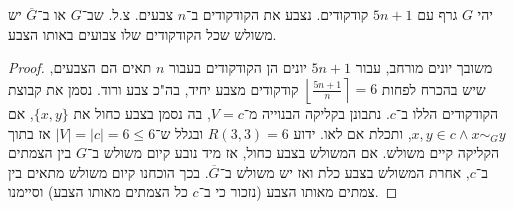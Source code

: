 \documentclass[]{article}
\newcommand\rc    {\right\rceil}
\newcommand\lf    {\left\lfloor}
\newcommand\ol    {\overline}
\begin{document}
	\section{}
	יהי $G$ גרף עם $5n + 1$ קודקודים. נצבע את הקודקודים ב־$n$ צבעים. צ.ל. שב־$G$ או ב־$\ol G$ יש משולש שכל הקודקודים שלו צבועים באותו הצבע. 
	
	\begin{proof}
		משובך יונים מורחב, עבור $5n  +1$ יונים הן הקודקודים בעבור $n$ תאים הם הצבעים, שיש בהכרח לפחות $\lf \frac{5n + 1}{n} \rc = 6$ קודקודים מצבע יחיד, בה"כ צבע ורוד. נסמן את קבוצת הקודקודים הללו ב־$c$. נתבונן בקליקה הבנוייה מ־$V = c$, בה נסמן בצבע כחול את $\{x, y\}$, אם $x, y \in c \land x \sim_G y$, ותכלת אם לאו. ידוע $R(3, 3) = 6$ ובגלל ש־$|V| = |c| = 6 \le 6$ אז בתוך הקליקה קיים משולש. אם המשולש בצבע כחול, אז מיד נובע קיום משולש ב־$G$ בין הצמתים ב־$c$, אחרת המשולש בצבע כלת ואז יש משולש ב־$\ol G$. בכך הוכחנו קיום משולש מתאים בין צמתים מאותו הצבע (נזכור כי ב־$c$ כל הצמתים מאותו הצבע) וסיימנו. 
	\end{proof}
	
\end{document}
